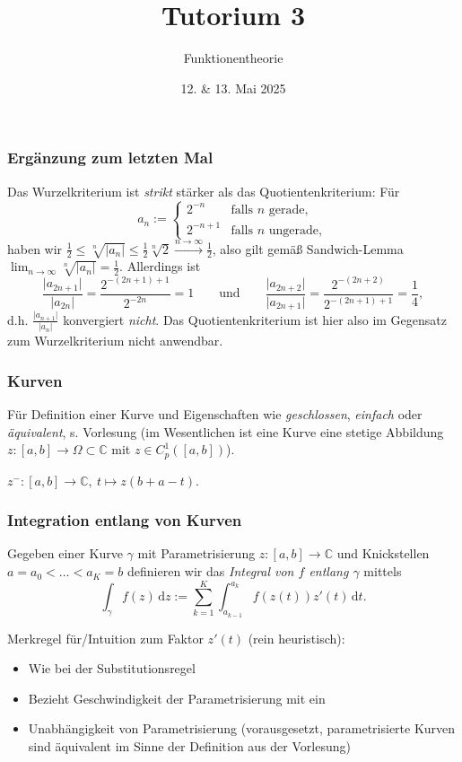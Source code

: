 \documentclass[10pt]{beamer}
\author[\url{https://fdf-uni.github.io/ft}]{}
\title{Tutorium 3}
\subtitle{\texorpdfstring{Funktionentheorie\vspace*{-1.5cm}}{Funktionentheorie}}
\date{12. \& 13. Mai 2025}
\begin{document}
\begin{frame}
	\titlepage
\end{frame}
\begin{frame}
	\frametitle{Ergänzung zum letzten Mal}
	\pause
	Das Wurzelkriterium ist \emph{strikt} stärker als das Quotientenkriterium: Für
	\[
		a_n := \begin{cases} 2^{-n} & \text{falls } n \text{ gerade}, \\ 2^{-n + 1} & \text{falls } n \text{ ungerade}, \end{cases}
	\]
	\pause
	haben wir $\frac{1}{2} \le \sqrt[n]{\lvert a_n \rvert} \le \frac{1}{2} \sqrt[n]{2} \overset{n \to \infty}{\longrightarrow} \frac{1}{2}$, also gilt gemäß \glqq Sandwich-Lemma\grqq{} $\lim_{n \to \infty} \sqrt[n]{\lvert a_n \rvert} = \frac{1}{2}$.
	\pause
	Allerdings ist
	\[
		\frac{\lvert a_{2n + 1} \rvert}{\lvert a_{2n} \rvert} = \frac{2^{-(2n + 1) + 1}}{2^{- 2 n}} = 1 \qquad \text{und} \qquad \frac{\lvert a_{2n + 2} \rvert}{\lvert a_{2n + 1} \rvert} = \frac{2^{-(2n + 2)}}{2^{-(2n + 1) + 1}} = \frac{1}{4},
	\]
	d.h. $\frac{\lvert a_{n + 1} \rvert}{\lvert a_n \rvert}$ konvergiert \emph{nicht}.
	Das Quotientenkriterium ist hier also im Gegensatz zum Wurzelkriterium nicht anwendbar.
\end{frame}
\begin{frame}
	\frametitle{Kurven}
	\pause
	Für Definition einer Kurve und Eigenschaften wie \emph{geschlossen}, \emph{einfach} oder \emph{äquivalent}, s. Vorlesung (im Wesentlichen ist eine Kurve eine stetige Abbildung $z \colon [a, b] \to \Omega \subset \mathbb{C}$ mit $z \in C_p^1([a, b])$).
	\pause
	\begin{definition}
		$z^{-} \colon [a, b] \to \mathbb{C}, \ t \mapsto z(b + a - t)$.
	\end{definition}
\end{frame}
\begin{frame}
	\frametitle{Integration entlang von Kurven}
	\begin{definition}[Kurvenintegral]
		Gegeben einer Kurve $\gamma$ mit Parametrisierung $z \colon [a, b] \to \mathbb{C}$ und \glqq{}Knickstellen\grqq{} $a = a_0 < \ldots < a_K = b$ definieren wir das \emph{Integral von $f$ entlang $\gamma$} mittels
		\[
			\int_{\gamma} f(z) \,\mathrm{d}z := \sum_{k=1}^{K} \int_{a_{k-1}}^{a_k} f(z(t)) z'(t) \,\mathrm{d}t.
		\]
	\end{definition}
	\pause
	Merkregel für/Intuition zum Faktor $z'(t)$ (rein heuristisch):
	\pause
	\begin{itemize}
		\item \glqq{}Wie bei der Substitutionsregel\grqq{}
		      \pause
		\item Bezieht \glqq{}Geschwindigkeit\grqq{} der Parametrisierung mit ein
		      \pause
		\item Unabhängigkeit von Parametrisierung (vorausgesetzt, parametrisierte Kurven sind äquivalent im Sinne der Definition aus der Vorlesung)
	\end{itemize}
\end{frame}
\end{document}
